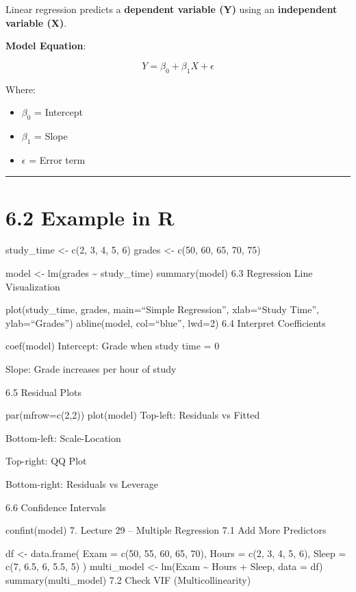 \documentclass[
  letterpaper,
  DIV=11,
  numbers=noendperiod]{scrreprt}
\providecommand{\tightlist}{%
  \setlength{\itemsep}{0pt}\setlength{\parskip}{0pt}}
\begin{document}
Linear regression predicts a \textbf{dependent variable (Y)} using an
\textbf{independent variable (X)}.

\textbf{Model Equation}:

\[
Y = \beta_0 + \beta_1 X + \epsilon
\]

Where:

\begin{itemize}
\tightlist
\item
  \(\beta_0\) = Intercept\\
\item
  \(\beta_1\) = Slope\\
\item
  \(\epsilon\) = Error term
\end{itemize}

\begin{center}\rule{0.5\linewidth}{0.5pt}\end{center}

\section{6.2 Example in R}\label{example-in-r}

study\_time \textless- c(2, 3, 4, 5, 6) grades \textless- c(50, 60, 65,
70, 75)

model \textless- lm(grades \textasciitilde{} study\_time) summary(model)
6.3 Regression Line Visualization

plot(study\_time, grades, main=``Simple Regression'', xlab=``Study
Time'', ylab=``Grades'') abline(model, col=``blue'', lwd=2) 6.4
Interpret Coefficients

coef(model) Intercept: Grade when study time = 0

Slope: Grade increases per hour of study

6.5 Residual Plots

par(mfrow=c(2,2)) plot(model) Top-left: Residuals vs Fitted

Bottom-left: Scale-Location

Top-right: QQ Plot

Bottom-right: Residuals vs Leverage

6.6 Confidence Intervals

confint(model) 7. Lecture 29 -- Multiple Regression 7.1 Add More
Predictors

df \textless- data.frame( Exam = c(50, 55, 60, 65, 70), Hours = c(2, 3,
4, 5, 6), Sleep = c(7, 6.5, 6, 5.5, 5) ) multi\_model \textless- lm(Exam
\textasciitilde{} Hours + Sleep, data = df) summary(multi\_model) 7.2
Check VIF (Multicollinearity)
\end{document}
